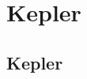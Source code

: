 \documentclass[hyperref={pdfpagelabels=false}]{beamer}
\begin{document}
\section{Kepler}

\subsection{Kepler}

\end{document}
